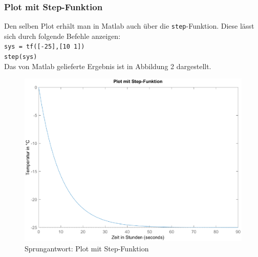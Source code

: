 \subsubsection{Plot mit Step-Funktion}
Den selben Plot erhält man in Matlab auch über die \texttt{step}-Funktion. Diese lässt sich durch folgende Befehle anzeigen:\\
\hspace*{0.5cm}\texttt{sys = tf([-25],[10 1])}\\
\hspace*{0.5cm}\texttt{step(sys)}\\
Das von Matlab gelieferte Ergebnis ist in Abbildung 2 dargestellt.
\begin{figure}[H]
    \centering
    \includegraphics[width=12cm]{images_2/Übergangsfunktion/Übergangsfkt_plot_stepfunktion.eps}
    \caption{Sprungantwort: Plot mit Step-Funktion}
\end{figure}

